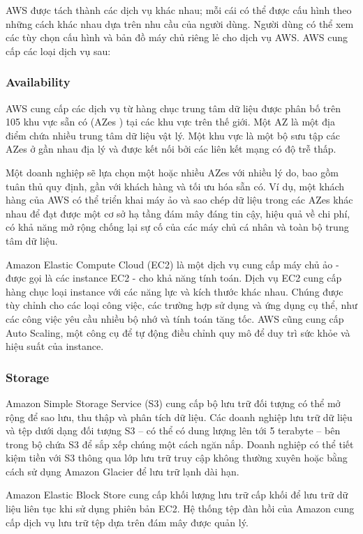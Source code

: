 AWS được tách thành các dịch vụ khác nhau; mỗi cái có thể được cấu hình theo những cách khác nhau dựa trên nhu cầu của người dùng. Người dùng có thể xem các tùy chọn cấu hình và bản đồ máy chủ riêng lẻ cho dịch vụ AWS. AWS cung cấp các loại dịch vụ sau:
\subsubsection{Availability}
AWS cung cấp các dịch vụ từ hàng chục trung tâm dữ liệu được phân bố trên 105 khu vực sẵn có (AZes \cite{aws_ec2_availability_zones}) tại các khu vực trên thế giới. Một AZ là một địa điểm chứa nhiều trung tâm dữ liệu vật lý. Một khu vực là một bộ sưu tập các AZes ở gần nhau địa lý và được kết nối bởi các liên kết mạng có độ trễ thấp.

Một doanh nghiệp sẽ lựa chọn một hoặc nhiều AZes với nhiều lý do, bao gồm tuân thủ quy định, gần với khách hàng và tối ưu hóa sẵn có. Ví dụ, một khách hàng của AWS có thể triển khai máy ảo và sao chép dữ liệu trong các AZes khác nhau để đạt được một cơ sở hạ tầng đám mây đáng tin cậy, hiệu quả về chi phí, có khả năng mở rộng chống lại sự cố của các máy chủ cá nhân và toàn bộ trung tâm dữ liệu.

Amazon Elastic Compute Cloud (EC2) là một dịch vụ cung cấp máy chủ ảo - được gọi là các instance EC2 - cho khả năng tính toán. Dịch vụ EC2 cung cấp hàng chục loại instance với các năng lực và kích thước khác nhau. Chúng được tùy chỉnh cho các loại công việc, các trường hợp sử dụng và ứng dụng cụ thể, như các công việc yêu cầu nhiều bộ nhớ và tính toán tăng tốc. AWS cũng cung cấp Auto Scaling, một công cụ để tự động điều chỉnh quy mô để duy trì sức khỏe và hiệu suất của instance.
\subsubsection{Storage}
Amazon Simple Storage Service (S3) cung cấp bộ lưu trữ đối tượng có thể mở rộng để sao lưu, thu thập và phân tích dữ liệu. Các doanh nghiệp lưu trữ dữ liệu và tệp dưới dạng đối tượng S3 -- có thể có dung lượng lên tới 5 terabyte -- bên trong bộ chứa S3 để sắp xếp chúng một cách ngăn nắp. Doanh nghiệp có thể tiết kiệm tiền với S3 thông qua lớp lưu trữ truy cập không thường xuyên hoặc bằng cách sử dụng Amazon Glacier \cite{aws_glacier} để lưu trữ lạnh dài hạn.

Amazon Elastic Block Store \cite{aws_ec2_concepts} cung cấp khối lượng lưu trữ cấp khối để lưu trữ dữ liệu liên tục khi sử dụng phiên bản EC2. Hệ thống tệp đàn hồi của Amazon cung cấp dịch vụ lưu trữ tệp dựa trên đám mây được quản lý.

